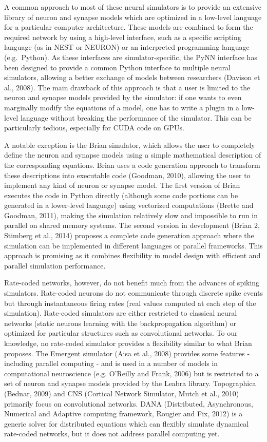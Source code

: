 \documentclass[
  11pt,
  a4paper,
]{scrbook}
\begin{document}
A common approach to most of these neural simulators is to provide an
extensive library of neuron and synapse models which are optimized in a
low-level language for a particular computer architecture. These models
are combined to form the required network by using a high-level
interface, such as a specific scripting language (as in NEST or NEURON)
or an interpreted programming language (e.g.~Python). As these
interfaces are simulator-specific, the PyNN interface has been designed
to provide a common Python interface to multiple neural simulators,
allowing a better exchange of models between researchers (Davison et
al., 2008). The main drawback of this approach is that a user is limited
to the neuron and synapse models provided by the simulator: if one wants
to even marginally modify the equations of a model, one has to write a
plugin in a low-level language without breaking the performance of the
simulator. This can be particularly tedious, especially for CUDA code on
GPUs.

A notable exception is the Brian simulator, which allows the user to
completely define the neuron and synapse models using a simple
mathematical description of the corresponding equations. Brian uses a
code generation approach to transform these descriptions into executable
code (Goodman, 2010), allowing the user to implement any kind of neuron
or synapse model. The first version of Brian executes the code in Python
directly (although some code portions can be generated in a lower-level
language) using vectorized computations (Brette and Goodman, 2011),
making the simulation relatively slow and impossible to run in parallel
on shared memory systems. The second version in development (Brian 2,
Stimberg et al., 2014) proposes a complete code generation approach
where the simulation can be implemented in different languages or
parallel frameworks. This approach is promising as it combines
flexibility in model design with efficient and parallel simulation
performance.

Rate-coded networks, however, do not benefit much from the advances of
spiking simulators. Rate-coded neurons do not communicate through
discrete spike events but through instantaneous firing rates (real
values computed at each step of the simulation). Rate-coded simulators
are either restricted to classical neural networks (static neurons
learning with the backpropagation algorithm) or optimized for particular
structures such as convolutional networks. To our knowledge, no
rate-coded simulator provides a flexibility similar to what Brian
proposes. The Emergent simulator (Aisa et al., 2008) provides some
features - including parallel computing - and is used in a number of
models in computational neuroscience (e.g. O'Reilly and Frank, 2006) but
is restricted to a set of neuron and synapse models provided by the
Leabra library. Topographica (Bednar, 2009) and CNS (Cortical Network
Simulator, Mutch et al., 2010) primarily focus on convolutional
networks. DANA (Distributed, Asynchronous, Numerical and Adaptive
computing framework, Rougier and Fix, 2012) is a generic solver for
distributed equations which can flexibly simulate dynamical rate-coded
networks, but it does not address parallel computing yet.
\end{document}
